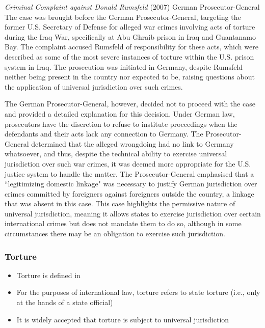 \begin{casedetails}{\textit{Criminal Complaint against Donald Rumsfeld} (2007) German Prosecutor-General}
    \flushleft
    The case was brought before the German Prosecutor-General, targeting the former U.S. Secretary of Defense for alleged war crimes involving acts of torture during the Iraq War, specifically at Abu Ghraib prison in Iraq and Guantanamo Bay. The complaint accused Rumsfeld of responsibility for these acts, which were described as some of the most severe instances of torture within the U.S. prison system in Iraq. The prosecution was initiated in Germany, despite Rumsfeld neither being present in the country nor expected to be, raising questions about the application of universal jurisdiction over such crimes.

    \vspace{\baselineskip}

    The German Prosecutor-General, however, decided not to proceed with the case and provided a detailed explanation for this decision. Under German law, prosecutors have the discretion to refuse to institute proceedings when the defendants and their acts lack any connection to Germany. The Prosecutor-General determined that the alleged wrongdoing had no link to Germany whatsoever, and thus, despite the technical ability to exercise universal jurisdiction over such war crimes, it was deemed more appropriate for the U.S. justice system to handle the matter. The Prosecutor-General emphasised that a ``legitimizing domestic linkage" was necessary to justify German jurisdiction over crimes committed by foreigners against foreigners outside the country, a linkage that was absent in this case. This case highlights the permissive nature of universal jurisdiction, meaning it allows states to exercise jurisdiction over certain international crimes but does not mandate them to do so, although in some circumstances there may be an obligation to exercise such jurisdiction.
\end{casedetails}

\subsubsection{Torture}
\begin{itemize}
    \item Torture is defined in 
    \item For the purposes of international law, torture refers to state torture (i.e., only at the hands of a state official)
    \item It is widely accepted that torture is subject to universal jurisdiction
\end{itemize}
    
